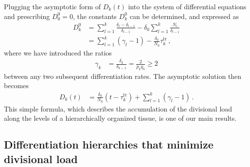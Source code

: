 \documentclass[aps,singlecolumn]{revtex4-1}
\begin{document}
Plugging the asymptotic form of
$D_k(t)$ into the system of differential equations and prescribing
$D_0^0=0$, the constants $D_k^0$ can be determined, and expressed as
%
\begin{align}
 D_k^0 &= \sum_{l=1}^k \frac{\delta_l -\delta_{l-1}}{\delta_{l-1}}
  - \delta_0 \sum_{l=1}^k \frac{N_l}{\delta_{l-1}}
\nonumber\\
 &= \sum_{l=1}^k (\gamma_l - 1) - \frac{\delta_0}{N_0} \tau_k^\textrm{tr}
\, ,
\end{align}
%
where we have introduced the ratios
%
\begin{align}
 \gamma_k &= \frac{\delta_k}{\delta_{k-1}} = \frac{2}{p_k q_k} \geq 2
\end{align}
%
between any two subsequent differentiation rates.
The asymptotic solution then becomes
%
\begin{align}
 D_k(t) &= \frac{\delta_0}{N_0} (t - \tau_k^\textrm{tr})
  + \sum_{l=1}^k (\gamma_l - 1)
\, .
\label{Dk}
\end{align}
%
This simple formula, which describes the accumulation of the divisional
load along the levels of a hierarchically organized tissue, is one of
our main results.

\subsection*{Differentiation hierarchies that minimize divisional load}
\end{document}
